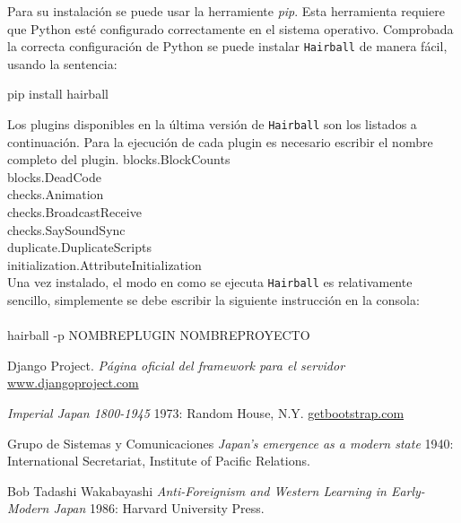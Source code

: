 \documentclass[a4paper, 12pt]{book}
\begin{document}
Para su instalación se puede usar la herramiente \emph{pip}. Esta herramienta
requiere que Python esté configurado correctamente en el sistema operativo.
Comprobada la correcta configuración de Python se puede instalar \texttt{Hairball}
de manera fácil, usando la sentencia:

\begin{center}
pip install hairball
\end{center}

Los plugins disponibles en la última versión de \texttt{Hairball} son los listados
a continuación. Para la ejecución de cada plugin es necesario escribir el 
nombre completo del plugin.
blocks.BlockCounts \\
blocks.DeadCode \\
checks.Animation \\
checks.BroadcastReceive \\
checks.SaySoundSync \\
duplicate.DuplicateScripts \\
initialization.AttributeInitialization \\

Una vez instalado, el modo en como se ejecuta \texttt{Hairball} es relativamente
sencillo, simplemente se debe escribir la siguiente instrucción en la consola: \\ \\
hairball -p NOMBREPLUGIN NOMBREPROYECTO





\cleardoublepage

%


 \begin{thebibliography}{1}

   Django Project. {\em Página oficial del framework para el servidor} \url{www.djangoproject.com}

     {\em Imperial Japan 1800-1945} 1973:
  Random House, N.Y. {\url{getbootstrap.com}}

   Grupo de Sistemas y Comunicaciones {\em Japan's emergence as a modern
  state} 1940: International Secretariat, Institute of Pacific
  Relations.

   Bob Tadashi Wakabayashi {\em Anti-Foreignism and Western
  Learning in Early-Modern Japan} 1986: Harvard University Press.

 \end{thebibliography}
\end{document}
